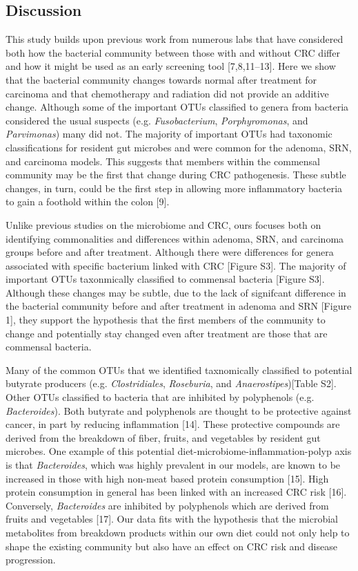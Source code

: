\documentclass[12pt,]{article}
\begin{document}
\newpage

\subsection{Discussion}\label{discussion}

This study builds upon previous work from numerous labs that have
considered both how the bacterial community between those with and
without CRC differ and how it might be used as an early screening tool
{[}7,8,11--13{]}. Here we show that the bacterial community changes
towards normal after treatment for carcinoma and that chemotherapy and
radiation did not provide an additive change. Although some of the
important OTUs classified to genera from bacteria considered the usual
suspects (e.g. \emph{Fusobacterium}, \emph{Porphyromonas}, and
\emph{Parvimonas}) many did not. The majority of important OTUs had
taxonomic classifications for resident gut microbes and were common for
the adenoma, SRN, and carcinoma models. This suggests that members
within the commensal community may be the first that change during CRC
pathogenesis. These subtle changes, in turn, could be the first step in
allowing more inflammatory bacteria to gain a foothold within the colon
{[}9{]}.

Unlike previous studies on the microbiome and CRC, ours focuses both on
identifying commonalities and differences within adenoma, SRN, and
carcinoma groups before and after treatment. Although there were
differences for genera associated with specific bacterium linked with
CRC {[}Figure S3{]}. The majority of important OTUs taxonmically
classified to commensal bacteria {[}Figure S3{]}. Although these changes
may be subtle, due to the lack of signifcant difference in the bacterial
community before and after treatment in adenoma and SRN {[}Figure 1{]},
they support the hypothesis that the first members of the community to
change and potentially stay changed even after treatment are those that
are commensal bacteria.

Many of the common OTUs that we identified taxnomically classified to
potential butyrate producers (e.g. \emph{Clostridiales},
\emph{Roseburia}, and \emph{Anaerostipes}){[}Table S2{]}. Other OTUs
classified to bacteria that are inhibited by polyphenols (e.g.
\emph{Bacteroides}). Both butyrate and polyphenols are thought to be
protective against cancer, in part by reducing inflammation {[}14{]}.
These protective compounds are derived from the breakdown of fiber,
fruits, and vegetables by resident gut microbes. One example of this
potential diet-microbiome-inflammation-polyp axis is that
\emph{Bacteroides}, which was highly prevalent in our models, are known
to be increased in those with high non-meat based protein consumption
{[}15{]}. High protein consumption in general has been linked with an
increased CRC risk {[}16{]}. Conversely, \emph{Bacteroides} are
inhibited by polyphenols which are derived from fruits and vegetables
{[}17{]}. Our data fits with the hypothesis that the microbial
metabolites from breakdown products within our own diet could not only
help to shape the existing community but also have an effect on CRC risk
and disease progression.
\end{document}
